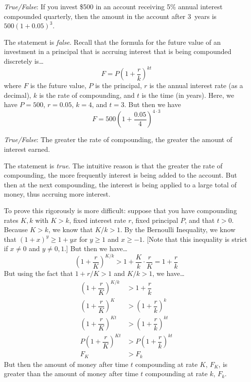 \documentclass[11pt,letterpaper]{article}
\begin{document}
\quizsol \textit{True/False}: If you invest \$500 in an account receiving 5\% annual interest compounded quarterly, then the amount in the account after 3~years is $500(1 + 0.05)^3$. \pspace

\sol The statement is \textit{false}. Recall that the formula for the future value of an investment in a principal that is accruing interest that is being compounded discretely is\dots
	\[
	F= P \left(1 + \dfrac{r}{k} \right)^{kt}
	\]
where $F$ is the future value, $P$ is the principal, $r$ is the annual interest rate (as a decimal), $k$ is the rate of compounding, and $t$ is the time (in years). Here, we have $P= 500$, $r= 0.05$, $k= 4$, and $t= 3$. But then we have 
	\[
	F= 500 \left(1 + \dfrac{0.05}{4} \right)^{4 \cdot 3}
	\] \pvspace{1.3cm}



\quizsol \textit{True/False}: The greater the rate of compounding, the greater the amount of interest earned. \pspace

\sol The statement is \textit{true}. The intuitive reason is that the greater the rate of compounding, the more frequently interest is being added to the account. But then at the next compounding, the interest is being applied to a large total of money, thus accruing more interest. \pspace

To prove this rigorously is more difficult: suppose that you have compounding rates $K, k$ with $K > k$, fixed interest rate $r$, fixed principal $P$, and that $t > 0$. Because $K > k$, we know that $K/k > 1$. By the Bernoulli Inequality, we know that $(1 + x)^y \geq 1 + yx$ for $y \geq 1$ and $x \geq  -1$. [Note that this inequality is strict if $x \neq 0$ and $y \neq 0, 1$.] But then we have\dots
	\[
	\left(1 + \dfrac{r}{K} \right)^{K/k} > 1 + \dfrac{K}{k} \cdot \dfrac{r}{K}= 1 + \dfrac{r}{k}
	\]
But using the fact that $1 + r/K > 1$ and $K/k > 1$, we have\dots
	\[
	\begin{aligned}
	\left(1 + \dfrac{r}{K} \right)^{K/k} &> 1 + \dfrac{r}{k} \\
	\left(1 + \dfrac{r}{K} \right)^K &> \left(1 + \dfrac{r}{k} \right)^k \\
	\left(1 + \dfrac{r}{K} \right)^{K t} &> \left(1 + \dfrac{r}{k} \right)^{k t} \\
	P \left(1 + \dfrac{r}{K} \right)^{K t} &> P \left(1 + \dfrac{r}{k} \right)^{k t} \\
	F_K &> F_k
	\end{aligned}
	\]
But then the amount of money after time $t$ compounding at rate $K$, $F_K$, is greater than the amount of money after time $t$ compounding at rate $k$, $F_k$. \pvspace{1.3cm}
\end{document}
